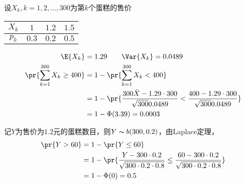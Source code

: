 \begin{analysis}
\begin{partlist}
	\item 设$X_k,k=1,2,\ldots,300$为第$k$个蛋糕的售价
	\begin{center}
	\begin{tabular}{c|ccc}
	$X_k$ & $1$ & $1.2$ & $1.5$\\\hline
	$p_k$ & $0.3$ & $0.2$ & $0.5$
	\end{tabular}
	\end{center}
	\[\begin{aligned}
	\E{X_k}&=1.29 \qquad \Var{X_k}=0.0489\\
	\pr{\sum_{k=1}^{300}X_k\geq 400}&=1-\pr{\sum_{k=1}^{300}X_k<400}\\
	&=1-\pr{\frac{300\bar{X}-1.29\cdot 300}{\sqrt{300}{0.0489}}<\frac{400-1.29\cdot 300}{\sqrt{300}{0.0489}}}\\
	&=1-\Phi(3.39)=0.0003
	\end{aligned}\]
	\item 记$Y$为售价为$1.2$元的蛋糕数目，则$Y\thicksim b(300,0.2)$，由Laplace定理，
	\[\begin{aligned}
	\pr{Y>60}&=1-\pr{Y\leq 60}\\
	&=1-\pr{\frac{Y-300\cdot 0.2}{\sqrt{300\cdot 0.2\cdot 0.8}}\leq\frac{60-300\cdot 0.2}{\sqrt{300\cdot 0.2\cdot 0.8}}}\\
	&=1-\Phi(0)=0.5
	\end{aligned}\]
\end{partlist}
\end{analysis}